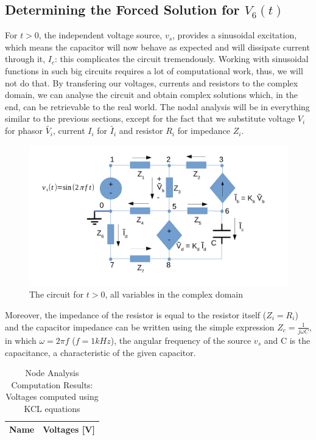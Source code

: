 \newpage
\subsection{Determining the Forced Solution for $V_6(t)$}

For $t>0$, the independent voltage source, $v_s$, provides a sinusoidal excitation, which means the capacitor will now behave as expected and will dissipate current through it, $I_c$: this complicates the circuit tremendously. Working with sinusoidal functions in such big circuits requires a lot of computational work, thus, we will not do that. By transfering our voltages, currents and resistors to the complex domain, we can analyse the circuit and obtain complex solutions which, in the end, can be retrievable to the real world. The nodal analysis will be in everything similar to the previous sections, except for the fact that we substitute voltage $V_i$ for phasor $\tilde{V_i}$, current $I_i$ for $\tilde{I_i}$ and resistor $R_i$ for impedance $Z_i$.

\begin{figure}[h] \centering
\includegraphics[width=0.6\linewidth]{t2-t3456.pdf}
\caption{The circuit for $t>0$, all variables in the complex domain}
\label{fig5}
\end{figure}

Moreover, the impedance of the resistor is equal to the resistor itself ($Z_i = R_i$) and the capacitor impedance can be written using the simple expression $Z_c = \frac{1}{j\omega C}$, in which $\omega = 2\pi f$ ($f =  1kHz$), the angular frequency of the source $v_s$ and C is the capacitance, a characteristic of the given capacitor. 

\begin{table}[h]
  \centering
  \begin{tabular}{|l|r|}
    \hline    
    {\bf Name} & {\bf Voltages [V]} \\ \hline
    
  \end{tabular}
  \caption{Node Analysis Computation Results: Voltages computed using KCL equations}
  \label{tab:nodeVoltages4}
\end{table}




